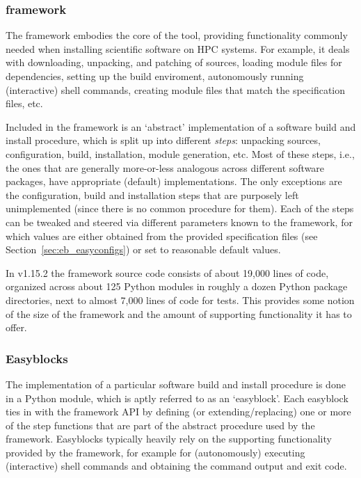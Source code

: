 \subsubsection{\easybuild{} framework}
\label{sec:eb_framework}

The \easybuild{} framework embodies the core of the tool,
providing functionality commonly needed when installing scientific software on HPC
systems. For example, it deals with downloading, unpacking, and patching of sources,
loading module files for dependencies, setting up the build enviroment, autonomously
running (interactive) shell commands, creating module files that match the
specification files, etc.

Included in the framework is an `abstract' implementation of a software build and
install procedure, which is split up into different \emph{steps}: unpacking sources,
configuration, build, installation, module generation, etc. Most of these steps,
i.e., the ones that are generally more-or-less analogous across
different software packages, have appropriate (default) implementations. The only
exceptions are the configuration, build and installation steps that are purposely
left unimplemented (since there is no common procedure for them). Each of the steps
can be tweaked and steered via different parameters known to the framework, for
which values are either obtained from the provided specification files (see
Section~\ref{sec:eb_easyconfigs}) or set to reasonable default values.

In \easybuild{} v1.15.2 the framework source code consists of about 19,000 lines
of code, organized across about 125 Python modules in roughly a dozen Python
package directories, next to almost 7,000 lines of code for tests. This provides some
notion of the size of the \easybuild{} framework and the amount of supporting
functionality it has to offer.

\subsubsection{Easyblocks}
\label{sec:eb_easyblocks}

The implementation of a particular software build and install procedure is done in
a Python module, which is aptly referred to as an `easyblock'. Each easyblock
ties in with the framework API by defining (or extending/replacing) one or more of
the step functions that are part of the abstract procedure used by the
\easybuild{} framework. Easyblocks typically heavily rely on the supporting
functionality provided by the framework, for example for (autonomously)
executing (interactive) shell commands and obtaining the command output and
exit code.

